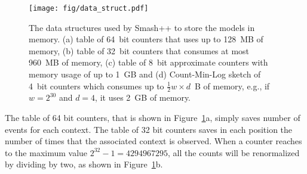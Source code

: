 \documentclass[a4paper,num-refs]{oup-contemporary}
\begin{document}

 \begin{figure}[!h]
   \centering
   \texttt{[image: fig/data\_struct.pdf]}
   \caption{The data structures used by Smash++ to store the models in memory. (a) table of 64~bit counters that uses up to 128~MB of memory, (b) table of 32~bit counters that consumes at most 960~MB of memory, (c) table of 8~bit approximate counters with memory usage of up to 1~GB and (d) Count-Min-Log sketch of 4~bit counters which consumes up to $\frac{1}{2} w\times d$~B of memory, e.g., if $w=2^{30}$ and $d=4$, it uses 2~GB of memory.}
   \label{fig.struct}
 \end{figure}

 The table of 64 bit counters, that is shown in Figure~\ref{fig.struct}a, simply saves number of events for each context. The table of 32 bit counters saves in each position the number of times that the associated context is observed. When a counter reaches to the maximum value $2^{32}-1=4294967295$, all the counts will be renormalized by dividing by two, as shown in Figure~\ref{fig.struct}b.
\end{document}
